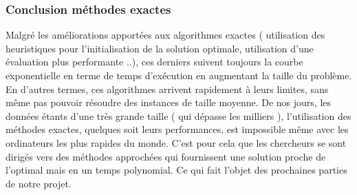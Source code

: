 \documentclass[12pt]{article}
\begin{document}
\subsubsection{Conclusion méthodes exactes}
Malgré les améliorations apportées aux algorithmes exactes ( utilisation des heuristiques pour l’initialisation de la solution optimale, utilisation d’une évaluation plus performante ..), ces derniers suivent toujours la courbe exponentielle en terme de temps d'exécution en augmentant la taille du problème. En d’autres termes, ces algorithmes arrivent rapidement à leurs limites, sans même pas pouvoir résoudre des instances de taille moyenne.
De nos jours, les données étants d’une très grande taille ( qui dépasse les milliers ), l’utilisation des méthodes exactes, quelques soit leurs performances, est impossible même avec les ordinateurs les plus rapides du monde. C’est pour cela que les chercheurs se sont dirigés vers des méthodes approchées qui fournissent une solution proche de l’optimal mais en un temps polynomial. Ce qui fait l’objet des prochaines parties de notre projet.
\end{document}
